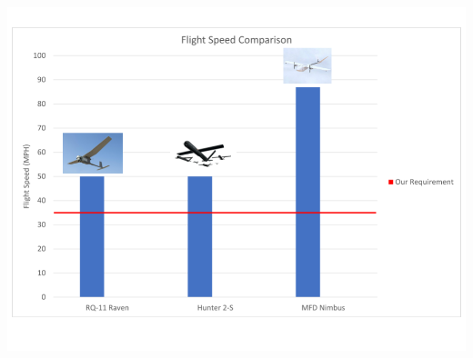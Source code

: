 \documentclass{beamer}
\begin{document}
    \begin{frame}
        \centering
        \includegraphics[width=\textwidth]{figures/market research/FlightSpeedComparison.png}
    \end{frame}
\end{document}
